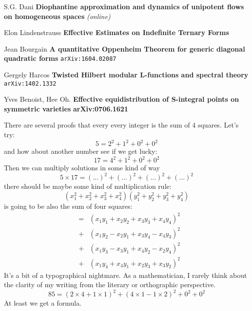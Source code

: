 \documentclass[12pt]{article}
\begin{document}
\newpage



\selectfont \fontsize{12}{10}\selectfont

\begin{thebibliography}{}

\item S.G. Dani \textbf{Diophantine approximation and dynamics of unipotent flows on homogeneous spaces} \textit{(online)}

\item Elon Lindenstrauss \textbf{Effective Estimates on Indefinite Ternary Forms}

\item Jean Bourgain
\textbf{A quantitative Oppenheim Theorem for generic diagonal quadratic forms} \texttt{arXiv:1604.02087}

\item Gergely Harcos \textbf{Twisted Hilbert modular L-functions and spectral theory} \texttt{arXiv:1402.1332}

\item Yves Benoist, Hee Oh. \textbf{Effective equidistribution of S-integral points on symmetric varieties} \textbf{arXiv:0706.1621}

\end{thebibliography}

\newpage

\selectfont \fontsize{20}{25}\selectfont

\noindent There are several proofs that every every integer is the sum of 4 squares.  Let's try: 
$$ 5 = 2^2 + 1^2 + 0^2 + 0^2 $$
and how about another number see if we get lucky:
$$ 17 = 4^2 + 1^2 + 0^2 + 0^2 $$ 
Then we can multiply solutions in some kind of way
$$ 5 \times 17 = (...)^2 + (...)^2 + (...)^2 + (...)^2 $$
there should be maybe some kind of multiplication rule:
$$ (x_1^2 + x_2^2 + x_3^2 + x_4^2)
(y_1^2 + y_2^2 + y_3^2 + y_4^2) $$
is going to be also the sum of four squares:
\begin{eqnarray*} &=& (x_1 y_1 + x_2 y_2 + x_3 y_3 + x_4 y_4)^2 \\
&+& (x_1 y_2 - x_2 y_1 + x_3 y_4 - x_4 y_3)^2 \\
&+& (x_1 y_3 - x_3 y_1 + x_4 y_2 - x_2 y_4)^2 \\
&+& (x_1 y_4 + x_4 y_1 + x_2 y_3 + x_3 y_2)^2    \end{eqnarray*}
It's a bit of a typographical nightmare.  As a mathematician, I rarely think about the clarity of my writing from the literary or orthographic perspective.
$$ 85 =  (2 \times 4 + 1 \times 1)^2 + (4 \times 1  - 1 \times 2)^2 + 0^2 + 0^2  $$
At least we get a formula. 
\end{document}
